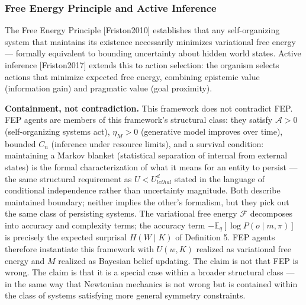 \documentclass[
]{article}
\begin{document}
\subsubsection{Free Energy Principle and Active
Inference}\label{free-energy-principle-and-active-inference}

The Free Energy Principle {[}Friston2010{]} establishes that any
self-organizing system that maintains its existence necessarily
minimizes variational free energy --- formally equivalent to bounding
uncertainty about hidden world states. Active inference
{[}Friston2017{]} extends this to action selection: the organism selects
actions that minimize expected free energy, combining epistemic value
(information gain) and pragmatic value (goal proximity).

\textbf{Containment, not contradiction.} This framework does not
contradict FEP. FEP agents are members of this framework's structural
class: they satisfy \(\mathcal{A} > 0\) (self-organizing systems act),
\(\eta_M > 0\) (generative model improves over time), bounded \(C_n\)
(inference under resource limits), and a survival condition: maintaining
a Markov blanket (statistical separation of internal from external
states) is the formal characterization of what it means for an entity to
persist --- the same structural requirement as \(U < U_{lethal}^d\)
stated in the language of conditional independence rather than
uncertainty magnitude. Both describe maintained boundary; neither
implies the other's formalism, but they pick out the same class of
persisting systems. The variational free energy \(\mathcal{F}\)
decomposes into accuracy and complexity terms; the accuracy term
\(-\mathbb{E}_q[\log P(o \mid m, \pi)]\) is precisely the expected
surprisal \(H(W \mid K)\) of Definition 5. FEP agents therefore
instantiate this framework with \(U(w,K)\) realized as variational free
energy and \(M\) realized as Bayesian belief updating. The claim is not
that FEP is wrong. The claim is that it is a special case within a
broader structural class --- in the same way that Newtonian mechanics is
not wrong but is contained within the class of systems satisfying more
general symmetry constraints.
\end{document}
